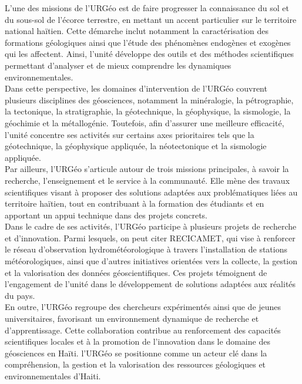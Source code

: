 \noindent L'une des missions de l’URGéo est de faire progresser la connaissance du sol et du sous-sol de l’écorce terrestre, en mettant un accent particulier sur le territoire national haïtien. Cette démarche inclut notamment la caractérisation des formations géologiques ainsi que l’étude des phénomènes endogènes et exogènes qui les affectent. Ainsi, l’unité développe des outils et des méthodes scientifiques permettant d’analyser et de mieux comprendre les dynamiques environnementales.\\

\noindent Dans cette perspective, les domaines d’intervention de l’URGéo couvrent plusieurs disciplines des géosciences, notamment la minéralogie, la pétrographie, la tectonique, la stratigraphie, la géotechnique, la géophysique, la sismologie, la géochimie et la métallogénie. Toutefois, afin d’assurer une meilleure efficacité, l’unité concentre ses activités sur certains axes prioritaires tels que la géotechnique, la géophysique appliquée, la néotectonique et la sismologie appliquée.\\

\noindent Par ailleurs, l’URGéo s’articule autour de trois missions principales, à savoir la recherche, l’enseignement et le service à la communauté. Elle mène des travaux scientifiques visant à proposer des solutions adaptées aux problématiques liées au territoire haïtien, tout en contribuant à la formation des étudiants et en apportant un appui technique dans des projets concrets.\\

\noindent Dans le cadre de ses activités, l’URGéo participe à plusieurs projets de recherche et d’innovation. Parmi lesquels, on peut citer RECICAMET, qui vise à renforcer le réseau d’observation hydrométéorologique à travers l’installation de stations météorologiques, ainsi que d’autres initiatives orientées vers la collecte, la gestion et la valorisation des données géoscientifiques. Ces projets témoignent de l’engagement de l’unité dans le développement de solutions adaptées aux réalités du pays.\\

\noindent En outre, l’URGéo regroupe des chercheurs expérimentés ainsi que de jeunes universitaires, favorisant un environnement dynamique de recherche et d’apprentissage. Cette collaboration contribue au renforcement des capacités scientifiques locales et à la promotion de l’innovation dans le domaine des géosciences en Haïti. l’URGéo se positionne comme un acteur clé dans la compréhension, la gestion et la valorisation des ressources géologiques et environnementales d'Haiti.

